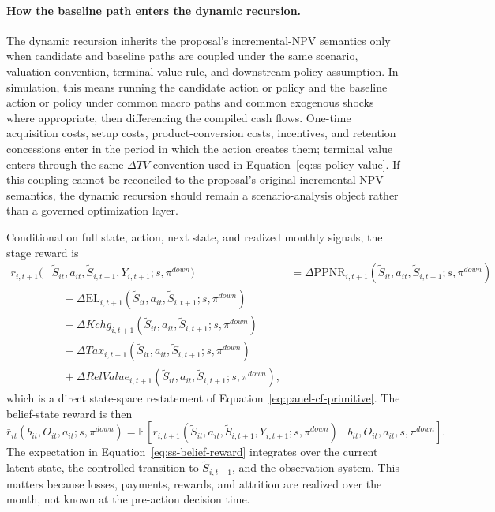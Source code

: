 \documentclass[11pt]{article}
\newcommand{\E}{\mathbb{E}}
\newcommand{\EL}{\mathrm{EL}}
\newcommand{\PPNR}{\mathrm{PPNR}}
\newcommand{\1}{\mathbf{1}}
\begin{document}
\paragraph{How the baseline path enters the dynamic recursion.}
The dynamic recursion inherits the proposal's incremental-NPV semantics only
when candidate and baseline paths are coupled under the same scenario,
valuation convention, terminal-value rule, and downstream-policy assumption.
In simulation, this means running the candidate action or policy and the
baseline action or policy under common macro paths and common exogenous shocks
where appropriate, then differencing the compiled cash flows. One-time
acquisition costs, setup costs, product-conversion costs, incentives, and
retention concessions enter in the period in which the action creates them;
terminal value enters through the same $\Delta TV$ convention used in
Equation~\eqref{eq:ss-policy-value}. If this coupling cannot be reconciled to
the proposal's original incremental-NPV semantics, the dynamic recursion should
remain a scenario-analysis object rather than a governed optimization layer.

Conditional on full state, action, next state, and realized monthly signals, the
stage reward is
\begin{align}
  r_{i,t+1}(&\widetilde S_{it},a_{it},\widetilde S_{i,t+1},Y_{i,t+1};
      s,\pi^{down})
  &=
  \Delta \PPNR_{i,t+1}(\widetilde S_{it},a_{it},\widetilde S_{i,t+1};
      s,\pi^{down})
  \nonumber\\
  &\quad
  - \Delta \EL_{i,t+1}(\widetilde S_{it},a_{it},\widetilde S_{i,t+1};
      s,\pi^{down})
  \nonumber\\
  &\quad
  - \Delta Kchg_{i,t+1}(\widetilde S_{it},a_{it},\widetilde S_{i,t+1};
      s,\pi^{down})
  \nonumber\\
  &\quad
  - \Delta Tax_{i,t+1}(\widetilde S_{it},a_{it},\widetilde S_{i,t+1};
      s,\pi^{down})
  \nonumber\\
  &\quad
  + \Delta RelValue_{i,t+1}(\widetilde S_{it},a_{it},\widetilde S_{i,t+1};
      s,\pi^{down}),
  \label{eq:ss-stage-reward}
\end{align}
which is a direct state-space restatement of Equation~\eqref{eq:panel-cf-primitive}.
The belief-state reward is then
\begin{equation}
  \bar r_{it}(b_{it},O_{it},a_{it};s,\pi^{down})
  =
  \E[
    r_{i,t+1}(\widetilde S_{it},a_{it},\widetilde S_{i,t+1},Y_{i,t+1};s,\pi^{down})
    \mid b_{it},O_{it},a_{it},s,\pi^{down}
  ].
  \label{eq:ss-belief-reward}
\end{equation}
The expectation in Equation~\eqref{eq:ss-belief-reward} integrates over the
current latent state, the controlled transition to $\widetilde S_{i,t+1}$, and
the observation system. This matters because losses, payments, rewards, and
attrition are realized over the month, not known at the pre-action decision time.
\end{document}
